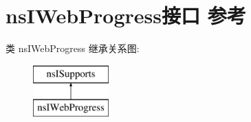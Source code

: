 \hypertarget{interfacens_i_web_progress}{}\section{ns\+I\+Web\+Progress接口 参考}
\label{interfacens_i_web_progress}
类 ns\+I\+Web\+Progress 继承关系图\+:\begin{figure}[H]
\begin{center}
\leavevmode
\includegraphics[height=2.000000cm]{interfacens_i_web_progress}
\end{center}
\end{figure}
